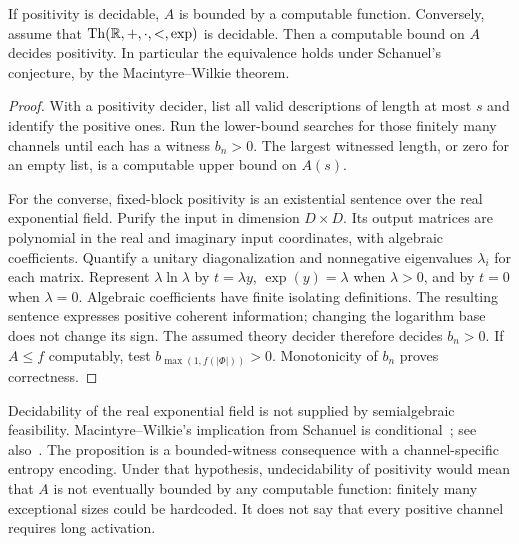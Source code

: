 \begin{proposition}\label{prop:activation}
If positivity is decidable, $A$ is bounded by a computable function.
Conversely, assume that $\operatorname{Th}(\mathbb R, +,\cdot,<,\exp)$ is
decidable. Then a computable bound on $A$ decides positivity. In
particular the equivalence holds under Schanuel's conjecture, by the
Macintyre--Wilkie theorem.
\end{proposition}
\begin{proof}
With a positivity decider, list all valid descriptions of length at most
$s$ and identify the positive ones. Run the lower-bound searches for
those finitely many channels until each has a witness $b_n>0$.
The largest witnessed length, or zero for an empty list, is a computable
upper bound on $A(s)$.

For the converse, fixed-block positivity is an existential sentence over
the real exponential field. Purify the input in dimension $D\times D$.
Its output matrices are polynomial in the real and imaginary input
coordinates, with algebraic coefficients. Quantify a unitary
diagonalization and nonnegative eigenvalues $\lambda_i$ for each matrix.
Represent $\lambda\ln\lambda$ by $t=\lambda y$, $\exp(y)=\lambda$ when
$\lambda>0$, and by $t=0$ when $\lambda=0$.
Algebraic coefficients have finite isolating definitions. The resulting
sentence expresses positive coherent information; changing the logarithm
base does not change its sign. The assumed theory decider therefore
decides $b_n>0$. If $A\leq f$ computably, test
$b_{\max(1,f(|\Phi|))}>0$. Monotonicity of $b_n$ proves correctness.
\end{proof}
\begin{remark}
Decidability of the real exponential field is not supplied by
semialgebraic feasibility. Macintyre--Wilkie's implication from Schanuel
is conditional~\cite{MW}; see also~\cite[version~3, Theorem~14.4]{BG}.
The proposition is a bounded-witness consequence with a channel-specific
entropy encoding. Under that hypothesis, undecidability of positivity
would mean that $A$ is not eventually bounded by any computable function:
finitely many exceptional sizes could be hardcoded. It does not say that
every positive channel requires long activation.
\end{remark}
